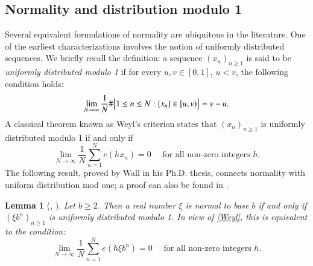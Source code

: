 \documentclass[12pt, twoside]{article}
\newtheorem{lemma}[theorem]{Lemma}
\theoremstyle{definition}
\numberwithin{equation}{section}
\begin{document}
\subsection{Normality and distribution modulo 1} \label{unif-dist-section}
Several equivalent formulations of normality are ubiquitous in the literature. One of the earliest characterizations involves the notion of uniformly distributed sequences. We briefly recall the definition:  a sequence $(x_n)_{n \geq 1}$ is said to be {\em{uniformly distributed modulo 1}} if for every $u, v \in [0, 1]$, $u < v$, the following condition holds:
\[ \lim_{N \rightarrow \infty} \frac{1}{N} \# \Bigl\{1 \leq n \leq N: \{x_n \} \in [u, v) \Bigr\} = v - u. \]
A classical theorem known as Weyl's criterion \cite[Theorem 1.2]{b12} states that $(x_n)_{n \geq 1}$ is uniformly distributed modulo 1 if and only if 
\begin{equation} \label{Weyl}
\lim_{N \rightarrow \infty} \frac{1}{N} \sum_{n=1}^{N} e(h x_n)  = 0 \quad \text{ for all non-zero integers } h. 
\end{equation}   
The following result, proved by Wall \cite{w49} in his Ph.D. thesis, connects normality with uniform distribution mod one; a proof can also be found in \cite[Theorem 4.14]{b12}. 
\begin{lemma}[\cite{w49}, {\cite[Theorem 4.14]{b12}}] \label{Weyl-lemma} 
Let $b \geq 2$. Then a real number $\xi$ is normal to base $b$ if and only if $(\xi b^n)_{n \geq 1}$ is uniformly distributed modulo 1. In view of \eqref{Weyl}, this is equivalent to the condition:
\begin{equation} \label{Weyl-2} 
\lim_{N \rightarrow \infty} \frac{1}{N} \sum_{n=1}^{N} e(h \xi b^n)  = 0 \quad \text{ for all non-zero integers } h. 
\end{equation}  
\end{lemma} 
\end{document}
